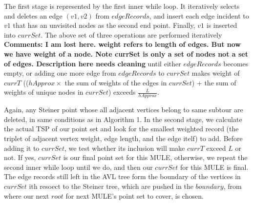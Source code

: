 The first stage is represented by the first inner while loop. It iteratively selects and deletes an edge $(v1,v2)$ from $edgeRecords$, and insert each  edge incident to $v1$ that has an unvisited nodes as the second end point. Finally, $v1$ is inserted into $currSet$. The above set of three operations are performed iteratively %
{\bf Comments: I am lost here. weight refers to length of edges. But now
  we have weight of a node. Note currSet is only a set of nodes not a set of
edges. Description here needs cleaning} 
until either $edgeRecords$ becomes empty, or adding one more edge from $edgeRecords$ to $currSet$ makes weight of $currT$ (($hApprox\times$ the sum of weights of the edges in $currSet$) + the sum of weights of unique nodes in $currSet$) exceeds $\frac{L}{hApprox}$.

Again, any Steiner point whose all adjacent vertices belong to same subtour are deleted, in same conditions as in Algorithm 1. In the second stage, we calculate the actual TSP of our point set and look for the smallest weighted record (the triplet of adjacent vertex weight, edge length, and the edge itelf) to add. Before adding it to $currSet$, we test whether its inclusion will make $currT$ exceed $L$ or not. If yes, $currSet$ is our final point set for this MULE, otherwise, we repeat the second inner while loop until we do, and then our $currSet$ for this MULE is final. The edge records still left in the AVL tree form the boundary of the vertices in $currSet$ ith resoect to the Steiner tree, which are pushed in the $boundary$, from where our next $root$ for next MULE's point set to cover, is chosen.

